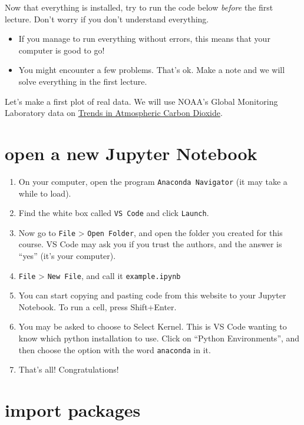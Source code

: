 \documentclass[
  letterpaper,
  DIV=11,
  numbers=noendperiod]{scrreprt}
\providecommand{\tightlist}{%
  \setlength{\itemsep}{0pt}\setlength{\parskip}{0pt}}\usepackage{longtable,booktabs,array}
\begin{document}
Now that everything is installed, try to run the code below
\emph{before} the first lecture. Don't worry if you don't understand
everything.

\begin{itemize}
\tightlist
\item
  If you manage to run everything without errors, this means that your
  computer is good to go!
\item
  You might encounter a few problems. That's ok. Make a note and we will
  solve everything in the first lecture.
\end{itemize}

Let's make a first plot of real data. We will use NOAA's Global
Monitoring Laboratory data on
\href{https://gml.noaa.gov/ccgg/trends/data.html}{Trends in Atmospheric
Carbon Dioxide}.

\section{open a new Jupyter Notebook}\label{open-a-new-jupyter-notebook}

\begin{enumerate}
\def\labelenumi{\arabic{enumi}.}
\tightlist
\item
  On your computer, open the program \texttt{Anaconda\ Navigator} (it
  may take a while to load).
\item
  Find the white box called \texttt{VS\ Code} and click \texttt{Launch}.
\item
  Now go to \texttt{File} \textgreater{} \texttt{Open\ Folder}, and open
  the folder you created for this course. VS Code may ask you if you
  trust the authors, and the answer is ``yes'' (it's your computer).
\item
  \texttt{File} \textgreater{} \texttt{New\ File}, and call it
  \texttt{example.ipynb}
\item
  You can start copying and pasting code from this website to your
  Jupyter Notebook. To run a cell, press Shift+Enter.
\item
  You may be asked to choose to Select Kernel. This is VS Code wanting
  to know which python installation to use. Click on ``Python
  Environments'', and then choose the option with the word
  \texttt{anaconda} in it.
\item
  That's all! Congratulations!
\end{enumerate}

\section{import packages}\label{import-packages}
\end{document}
